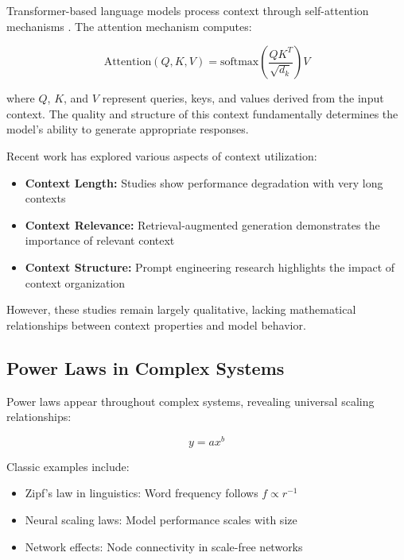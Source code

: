 \documentclass[conference]{IEEEtran}
\begin{document}
Transformer-based language models process context through self-attention mechanisms \cite{vaswani2017attention}. The attention mechanism computes:

\begin{equation}
\text{Attention}(Q,K,V) = \text{softmax}\left(\frac{QK^T}{\sqrt{d_k}}\right)V
\end{equation}

where $Q$, $K$, and $V$ represent queries, keys, and values derived from the input context. The quality and structure of this context fundamentally determines the model's ability to generate appropriate responses.

Recent work has explored various aspects of context utilization:
\begin{itemize}
\item \textbf{Context Length:} Studies show performance degradation with very long contexts \cite{liu2023lost}
\item \textbf{Context Relevance:} Retrieval-augmented generation demonstrates the importance of relevant context \cite{lewis2020retrieval}
\item \textbf{Context Structure:} Prompt engineering research highlights the impact of context organization \cite{wei2022emergent}
\end{itemize}

However, these studies remain largely qualitative, lacking mathematical relationships between context properties and model behavior.

\subsection{Power Laws in Complex Systems}

Power laws appear throughout complex systems, revealing universal scaling relationships:

\begin{equation}
y = ax^b
\end{equation}

Classic examples include:
\begin{itemize}
\item Zipf's law in linguistics: Word frequency follows $f \propto r^{-1}$ \cite{zipf1949human}
\item Neural scaling laws: Model performance scales with size \cite{kaplan2020scaling}
\item Network effects: Node connectivity in scale-free networks
\end{itemize}
\end{document}
